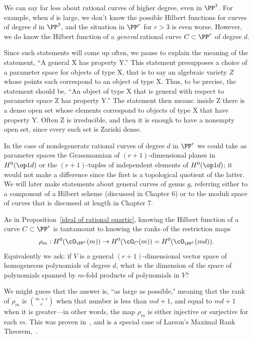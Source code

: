 We can say far less about rational curves of higher degree, even in $\PP^3$. For example, when $d$ is large, we
don't know the possible Hilbert functions for curves of degree $d$ in $\PP^3$, and the situation in $\PP^r$ for
$r>3$ is even worse. However, we do know the Hilbert function of a \emph{general} rational curve $C \subset \PP^r$ of degree $d$. 

Since such statements will come up often, we pause to explain the meaning of the statement, ``A general X has property Y.'' This statement presupposes a choice of a parameter space for objects of type X,
that is to say an algebraic variety $Z$ whose points each correspond to an object of type X. Thus, to be precise, the statement should be,
``An  object of type X that is general with respect to parameter space Z has property Y.'' The statement then means: inside Z there is
a dense open set whose elements correspond to objects of type X that have property Y. Often Z is irreducible, and
then it is enough to have a nonempty open set, since every such set is Zariski dense.

 In the case of nondegenerate rational curves
of degree $d$ in $\PP^{r}$ we could take as parameter spaces the Grassmannian of $(r+1)$-dimensional planes in $H^{0}(\op1d)$ or the
$(r+1)$-tuples of independent elements of $H^{0}(\op1d)$; it would not make a difference since the first is a topological
quotient of the latter. We will later make statements about general curves of genus $g$, referring either to 
a component of a Hilbert scheme (discussed in Chapter 6) or to the
moduli space of curves that is discussed at length in Chapter 7.

As in Proposition~\ref{ideal of rational quartic}, knowing the Hilbert function of a curve $C\subset \PP^{r}$ is tantamount to knowing the ranks of the restriction maps
$$
\rho_m : H^0(\cO_{\PP^r}(m)) \to H^0(\cO_C(m)) = H^0(\cO_{\PP^1}(md)).
$$
Equivalently we ask: if $V$ is a general  $(r+1)$-dimensional vector space of homogeneous polynomials of degree $d$, what is the dimension of the space of polynomials spanned by $m$-fold products of polynomials in $V$? 

We might guess that the answer is, ``as large as possible," meaning that the rank of $\rho_m$ is $\binom{m+r}{r}$ when that number is less than $md+1$, and equal to $md+1$ when it is greater---in other words, the map $\rho_m$ is either injective or surjective for each $m$. This was proven in~\cite{Ballico-Ellia83}, and is a special case of Larson's Maximal Rank Theorem,~\cite{Larson}.

